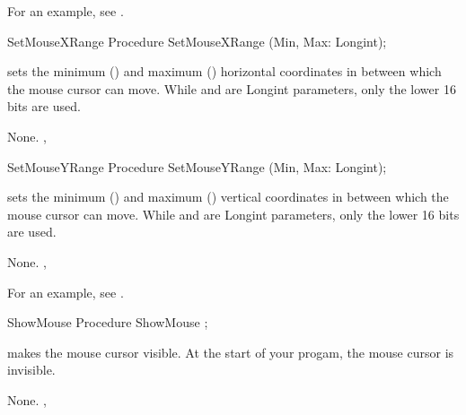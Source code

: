 For an example, see .

\begin{procedure}{SetMouseXRange}
\Declaration
Procedure SetMouseXRange (Min, Max: Longint);

\Description
 
sets the minimum () and maximum () horizontal coordinates in between which the
mouse cursor can move.
While  and  are Longint parameters, only the lower 16 bits 
are used.

\Errors
None.
\SeeAlso
{}, 
\end{procedure}


\begin{procedure}{SetMouseYRange}
\Declaration
Procedure SetMouseYRange (Min, Max: Longint);

\Description

sets the minimum () and maximum () vertical coordinates in between which the
mouse cursor can move.
While  and  are Longint parameters, only the lower 16 bits 
are used.

\Errors
None.
\SeeAlso
{}, 
\end{procedure}

For an example, see .

\begin{procedure}{ShowMouse}
\Declaration
Procedure ShowMouse ;

\Description

 makes the mouse cursor visible.
At the start of your progam, the mouse cursor is invisible.

\Errors
None.
\SeeAlso
{},
\end{procedure}


